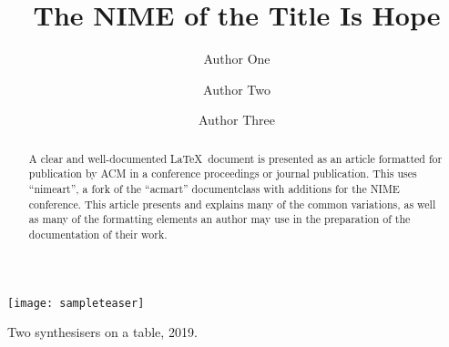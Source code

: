 \documentclass[acmsmall]{nimeart}
\begin{document}
\title{The NIME of the Title Is Hope}

\author{Author One}

\author{Author Two}

\author{Author Three}

\renewcommand{\shortauthors}{Trovato et al.}

\begin{abstract}
  A clear and well-documented \LaTeX\ document is presented as an
  article formatted for publication by ACM in a conference proceedings
  or journal publication. This uses ``nimeart'', a fork of the ``acmart''
  documentclass with additions for the NIME conference. This
  article presents and explains many of the common variations, as well
  as many of the formatting elements an author may use in the
  preparation of the documentation of their work.
\end{abstract}

\begin{teaserfigure}
  \texttt{[image: sampleteaser]}
  \caption{Two synthesisers on a table, 2019.}
  \label{fig:teaser}
\end{teaserfigure}

\maketitle
\end{document}
